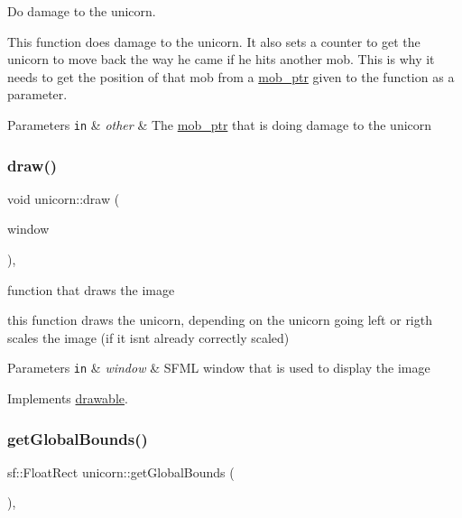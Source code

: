 Do damage to the unicorn. 

This function does damage to the unicorn. It also sets a counter to get the unicorn to move back the way he came if he hits another mob. This is why it needs to get the position of that mob from a \hyperlink{typedefs_8hpp_a09ee7f853fc9bc830a9445a06fd53d4b}{mob\+\_\+ptr} given to the function as a parameter.


\begin{DoxyParams}[1]{Parameters}
\mbox{\tt in}  & {\em other} & The \hyperlink{typedefs_8hpp_a09ee7f853fc9bc830a9445a06fd53d4b}{mob\+\_\+ptr} that is doing damage to the unicorn \\
\hline
\end{DoxyParams}
\mbox{\label{classunicorn_a570c34d5669a8d2a61bdc1481e6f9dee}} 
\subsubsection{\texorpdfstring{draw()}{draw()}}
{\footnotesize\ttfamily void unicorn\+::draw (\begin{DoxyParamCaption}\item[{sf\+::\+Render\+Window \&}]{window }\end{DoxyParamCaption})\hspace{0.3cm}{\ttfamily [override]}, {\ttfamily [virtual]}}



function that draws the image 

this function draws the unicorn, depending on the unicorn going left or rigth scales the image (if it isn\textquotesingle{}t already correctly scaled)


\begin{DoxyParams}[1]{Parameters}
\mbox{\tt in}  & {\em window} & S\+F\+ML window that is used to display the image \\
\hline
\end{DoxyParams}


Implements \hyperlink{classdrawable_a4e49e2c1121704c83ce24c5f48dd910f}{drawable}.

\mbox{\label{classunicorn_a1bac09fc59b04f14f5a093bc4daa04da}} 
\subsubsection{\texorpdfstring{get\+Global\+Bounds()}{getGlobalBounds()}}
{\footnotesize\ttfamily sf\+::\+Float\+Rect unicorn\+::get\+Global\+Bounds (\begin{DoxyParamCaption}{ }\end{DoxyParamCaption})\hspace{0.3cm}{\ttfamily [override]}, {\ttfamily [virtual]}}



